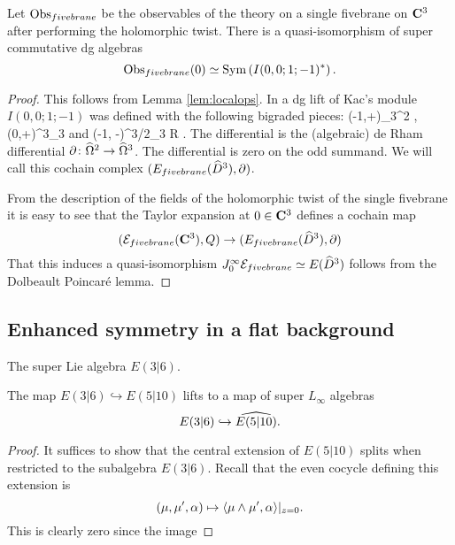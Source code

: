 \documentclass[11pt]{amsart}
\begin{document}
\begin{prop}
Let $\Obs_{fivebrane}$ be the observables of the theory on a single fivebrane on $\C^3$ after performing the holomorphic twist.
There is a quasi-isomorphism of super commutative dg algebras 
\[
\Obs_{fivebrane} (0) \simeq \Sym \left( I(0,0;1;-1)^* \right) .
\]
\end{prop}
\begin{proof}
This follows from Lemma \ref{lem:localops}.
In \cite{SWsuca6d} a dg lift of Kac's module $I(0,0;1;-1)$ was defined with the following bigraded pieces:
\beqn
{} (-1,+)\colon \quad \Hat{\Omega}_3^{2} , \qquad {} (0,+)\colon \quad \Hat{\Omega}^{3}_3
\eeqn
and
\beqn
{} (-1, -)\colon \quad \Hat{\Omega}^{3/2}_{3} \otimes R .
\eeqn
The differential is the (algebraic) de Rham differential $\del \colon \Hat{\Omega}^2 \to \Hat{\Omega}^3$. 
The differential is zero on the odd summand.
We will call this cochain complex $(E_{fivebrane}(\Hat{D}^3), \del)$.

From the description of the fields of the holomorphic twist of the single fivebrane it is easy to see that the Taylor expansion at $0 \in \C^3$ defines a cochain map
\[
(\cE_{fivebrane} (\C^3), Q) \to (E_{fivebrane}(\Hat{D}^3), \del) 
\]
That this induces a quasi-isomorphism $J_0^\infty \cE_{fivebrane} \simeq E (\Hat{D}^3)$ follows from the Dolbeault Poincar\'e lemma.
\end{proof}

\subsection{Enhanced symmetry in a flat background}

\parsec[s:locallieE510]


\parsec[s:weight]


\parsec[s:e36]

The super Lie algebra $E(3|6)$. 

\begin{lem} 
The map $E(3|6) \hookrightarrow E(5|10)$ lifts to a map of super $L_\infty$ algebras 
\[
E(3|6) \hookrightarrow \Hat{E(5|10)} .
\]
\end{lem}
\begin{proof}
It suffices to show that the central extension of $E(5|10)$ splits when restricted to the subalgebra $E(3|6)$. 
Recall that the even cocycle defining this extension is 
\[
(\mu, \mu', \alpha) \mapsto \<\mu \wedge \mu' , \alpha\>|_{z=0} .
\]
This is clearly zero since the image 
\end{proof}
\end{document}
